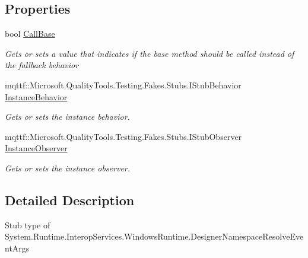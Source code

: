 \subsection*{Properties}
\begin{DoxyCompactItemize}
\item 
bool \hyperlink{class_system_1_1_runtime_1_1_interop_services_1_1_windows_runtime_1_1_fakes_1_1_stub_designer_namespace_resolve_event_args_a0398d024820f6a00704f02b8caee19f4}{Call\-Base}
\begin{DoxyCompactList}\small\item\em Gets or sets a value that indicates if the base method should be called instead of the fallback behavior\end{DoxyCompactList}\item 
mqttf\-::\-Microsoft.\-Quality\-Tools.\-Testing.\-Fakes.\-Stubs.\-I\-Stub\-Behavior \hyperlink{class_system_1_1_runtime_1_1_interop_services_1_1_windows_runtime_1_1_fakes_1_1_stub_designer_namespace_resolve_event_args_aa0e926a5927c4af0607b4bcded98677b}{Instance\-Behavior}
\begin{DoxyCompactList}\small\item\em Gets or sets the instance behavior.\end{DoxyCompactList}\item 
mqttf\-::\-Microsoft.\-Quality\-Tools.\-Testing.\-Fakes.\-Stubs.\-I\-Stub\-Observer \hyperlink{class_system_1_1_runtime_1_1_interop_services_1_1_windows_runtime_1_1_fakes_1_1_stub_designer_namespace_resolve_event_args_a213955f251da26130483f9d5301df077}{Instance\-Observer}
\begin{DoxyCompactList}\small\item\em Gets or sets the instance observer.\end{DoxyCompactList}\end{DoxyCompactItemize}


\subsection{Detailed Description}
Stub type of System.\-Runtime.\-Interop\-Services.\-Windows\-Runtime.\-Designer\-Namespace\-Resolve\-Event\-Args



